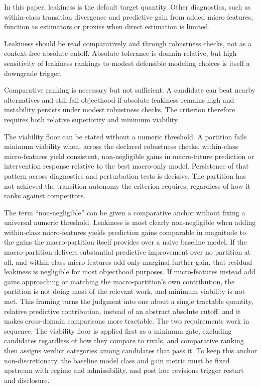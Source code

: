 In this paper, leakiness is the default target quantity. Other
diagnostics, such as within-class transition divergence and predictive
gain from added micro-features, function as estimators or proxies when
direct estimation is limited.

Leakiness should be read comparatively and through robustness
checks, not as a context-free absolute cutoff. Absolute tolerance is
domain-relative, but high sensitivity of leakiness rankings to modest
defensible modeling choices is itself a downgrade trigger.

Comparative ranking is necessary but not sufficient. A candidate can
beat nearby alternatives and still fail objecthood if absolute leakiness
remains high and instability persists under modest robustness checks.
The criterion therefore requires both relative superiority and minimum
viability.

The viability floor can be stated without a numeric threshold. A
partition fails minimum viability when, across the declared robustness
checks, within-class micro-features yield consistent, non-negligible
gains in macro-future prediction or intervention response relative to
the best macro-only model. Persistence of that pattern across
diagnostics and perturbation tests is decisive. The partition has not
achieved the transition autonomy the criterion requires, regardless of
how it ranks against competitors.

The term ``non-negligible'' can be given a comparative anchor without
fixing a universal numeric threshold. Leakiness is most clearly
non-negligible when adding within-class micro-features yields prediction
gains comparable in magnitude to the gains the macro-partition itself
provides over a naive baseline model. If the macro-partition delivers
substantial predictive improvement over no partition at all, and
within-class micro-features add only marginal further gain, that
residual leakiness is negligible for most objecthood purposes. If
micro-features instead add gains approaching or matching the
macro-partition's own contribution, the partition is not doing most of
the relevant work, and minimum viability is not met. This framing turns
the judgment into one about a single tractable quantity, relative
predictive contribution, instead of an abstract absolute cutoff, and it
makes cross-domain comparisons more tractable. The two requirements work
in sequence. The viability floor is applied first as a minimum gate,
excluding candidates regardless of how they compare to rivals, and
comparative ranking then assigns verdict categories among candidates that
pass it. To keep this anchor non-discretionary, the baseline model class
and gain metric must be fixed upstream with regime and admissibility,
and post hoc revisions trigger restart and disclosure.

